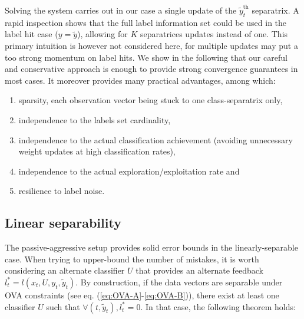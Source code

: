 \documentclass[preprint,12pt,authoryear]{elsarticle}
\begin{document}
Solving the system carries out in our case a single update of the  $\tilde{y}_t^\text{th}$ separatrix. 
A rapid inspection shows that the full label information set could be used in the label hit case ($y = \tilde{y}$), allowing for $K$ separatrices updates instead of one. This primary intuition is however not considered here, for multiple updates may put a too strong momentum on label hits.  
We show in the following that our careful and conservative approach %
is enough to provide strong convergence guarantees in most cases. 
It moreover provides many practical advantages, among which:
\begin{enumerate}
	\item sparsity, each observation vector being stuck to one class-separatrix only, 
	\item independence to the labels set cardinality, 
	\item independence to the actual classification achievement (avoiding unnecessary weight updates at high classification rates), 
	\item independence to the actual exploration/exploitation rate and 
	\item resilience to label noise.
\end{enumerate}


\subsection{Linear separability}
The passive-aggressive setup provides solid error bounds in the linearly-separable case. 
When trying to upper-bound the number of mistakes, it is worth considering an alternate classifier $U$ that provides an alternate feedback $l^*_t = l(x_t,U,y_t,\tilde{y}_t)$. By construction, if the data vectors are separable under OVA constraints (see eq. (\ref{eq:OVA-A}-\ref{eq:OVA-B})), there exist at least one classifier $U$ such that $\forall (t, \tilde{y}_t), l^*_t = 0$. In that case, the following theorem holds:

\end{document}
